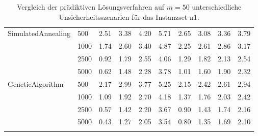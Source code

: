 {\begin{longtable}{ll|rrrr|rrrr}
SimulatedAnnealing & 500  & 2.51 & 3.38 & 4.20 & 5.71 & 2.65 & 3.08 & 3.36 & 3.79 \\
                 & 1000 & 1.74 & 2.60 & 3.40 & 4.87 & 2.25 & 2.61 & 2.86 & 3.17 \\
                 & 2500 & 0.92 & 1.79 & 2.55 & 4.06 & 1.29 & 1.82 & 2.13 & 2.54 \\
                 & 5000 & 0.62 & 1.48 & 2.28 & 3.78 & 1.01 & 1.60 & 1.90 & 2.32 \\ \hline
GeneticAlgorithm & 500  & 2.17 & 2.99 & 3.77 & 5.25 & 2.15 & 2.42 & 2.61 & 2.94 \\
                 & 1000 & 1.09 & 1.92 & 2.70 & 4.18 & 1.37 & 1.76 & 2.03 & 2.42 \\
                 & 2500 & 0.57 & 1.42 & 2.20 & 3.67 & 0.90 & 1.43 & 1.74 & 2.16 \\
                 & 5000 & 0.43 & 1.27 & 2.05 & 3.54 & 0.80 & 1.35 & 1.69 & 2.10 \\
\bottomrule
\caption{Vergleich der prädiktiven Lösungsverfahren auf $m=50$ unterschiedliche Unsicherheitsszenarien für das Instanzset n1. }
\label{tab:evaluation_predictive_n1}
\end{longtable}
}
\vspace*{-25px}
\begin{figure}[H]
\end{figure}